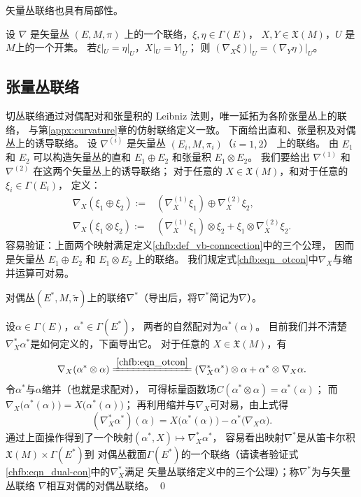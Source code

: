 矢量丛联络也具有局部性。
\begin{proposition}
    设 $\nabla$ 是矢量丛 $(E,M,\pi)$ 上的一个联络，$\xi, \eta \in \Gamma(E)$，
    $ X, Y \in \mathfrak{X}(M)$，$U$ 是 $M$上的一个开集。
    若$ \xi|_U = \eta|_U$，$ X|_U = Y|_U $；
    则 $\left.\left(\nabla_X \xi\right)\right|_U=\left.\left(\nabla_Y \eta\right)\right|_U$。
\end{proposition}

\subsection{张量丛联络}

切丛联络通过对偶配对和张量积的 Leibniz 法则，唯一延拓为各阶张量丛上的联络，
与第\ref{appx:curvature}章的仿射联络定义一致。
下面给出直和、张量积及对偶丛上的诱导联络。
设 $\nabla^{(i)}$ 是矢量丛 $(E_i, M,\pi_i)$（$i=1,2$） 上的联络。
由 $E_1$ 和 $E_2$ 可以构造矢量丛的直和 $E_1 \oplus E_2$ 和张量积 $E_1 \otimes E_2$。
我们要给出 $\nabla^{(1)}$ 和 $\nabla^{(2)}$ 在这两个矢量丛上的诱导联络；
对于任意的 $X \in \mathfrak{X}(M)$，和对于任意的 $\xi_i \in \Gamma(E_i)$，
定义：
\begin{align}
    \nabla_X\left(\xi_1 \oplus \xi_2\right):=&
    \left(\nabla_X^{(1)} \xi_1\right) \oplus \nabla_X^{(2)} \xi_2,  \\
    \nabla_X\left(\xi_1 \otimes \xi_2\right):=& \left(\nabla_X^{(1)} \xi_1\right) \otimes
    \xi_2+\xi_1 \otimes \nabla_X^{(2)} \xi_2 . \label{chfb:eqn_otcon}
\end{align}
容易验证：上面两个映射满足定义\ref{chfb:def_vb-conncection}中的三个公理，
因而是矢量丛 $E_1 \oplus E_2$ 和 $E_1 \otimes E_2$ 上的联络。
我们规定式\eqref{chfb:eqn_otcon}中$\nabla_X$与缩并运算可对易。

\begin{example}
    对偶丛$(E^*,M,\tilde{\pi})$上的联络$\nabla^*$（导出后，将$\nabla^*$简记为$\nabla$）。
\end{example}
设$\alpha \in \Gamma(E)$，$\alpha^*\in \Gamma(E^*)$，
两者的自然配对为$\alpha^*(\alpha)$。
目前我们并不清楚$\nabla_X^* \alpha^*$是如何定义的，下面导出它。
对于任意的 $X \in \mathfrak{X}(M)$，有
\begin{equation*}
    \nabla_X( \alpha^* \otimes \alpha )\xlongequal{\ref{chfb:eqn_otcon}}
    (\nabla_X^* \alpha^*)\otimes \alpha + \alpha^* \otimes \nabla_X \alpha .
\end{equation*}
令$\alpha^*$与$\alpha$缩并（也就是求配对），
可得标量函数场$C(\alpha^* \otimes \alpha)=\alpha^*(\alpha)$；
而$\nabla_X\bigl( \alpha^*(\alpha) \bigr)=X \bigl( \alpha^*(\alpha) \bigr)$；
再利用缩并与$\nabla_X$可对易，由上式得
\begin{equation}\label{chfb:eqn_dual-con}
    (\nabla_X^* \alpha^* )(\alpha)=X\bigl(\alpha^*(\alpha)\bigr)-\alpha^*\bigl(\nabla_X \alpha\bigr).
\end{equation}
通过上面操作得到了一个映射$(\alpha^*, X) \mapsto \nabla_X^* \alpha^*$，
容易看出映射$\nabla^*$是从笛卡尔积$\mathfrak{X}(M)\times \Gamma(E^*)$到
对偶丛截面$\Gamma (E^*)$的一个联络（请读者验证式\eqref{chfb:eqn_dual-con}中的$\nabla_X^*$满足
矢量丛联络定义中的三个公理）；称$\nabla^*$为与矢量丛联络 $\nabla$相互对偶的对偶丛联络。
\qed


